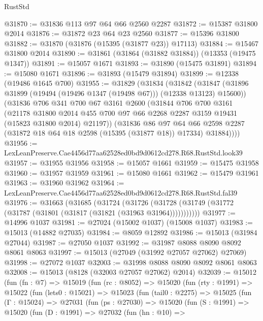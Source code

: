 \begin{lexlean}{RustStd}
\begin{coremodule}
@31870 := @31836 @113 @97 @64 @66 @2560 @2287
@31872 := @15387 @31800 @2014
@31876 := @31872 @23 @64 @23 @2560
@31877 := @15396 @31800
@31882 := @31870 (@31876 (@15395 (@31877 @23)) @17113)
@31884 := @15467 @31800 @2014
@31890 := @31861 (@31864 (@31882 @31884)) (@13353 (@19475 @1347))
@31891 := @15057 @1671
@31893 := @31890 (@15475 @31891)
@31894 := @15080 @1671
@31896 := @31893 (@15479 @31894)
@31899 := @12338 (@19486 @1645 @700)
@31955 := @31829
    (@31834
      (@31842
        (@31847 (@31896 @31899 (@19494 (@19496 @1347 (@19498 @67))) (@12338 @13123) @15600))
        (@31836
          @706
          @341
          @700
          @67
          @3161
          @2600
          (@31844
            @706
            @700
            @3161
            (@21178
              @31800
              @2014
              @455
              @700
              @97
              @66
              @2268
              @2287
              @3159
              @19431
              (@15823 @31800 @2014)
              @21197))
          (@31836
            @86
            @97
            @64
            @66
            @2598
            @2287
            (@31872 @18 @64 @18 @2598 (@15395 (@31877 @18)) @17334)
            @31884))))
@31956 := LexLeanPreserve.Cae4456d77aa62528ed0bd9d0612cd278.R68.RustStd.look39
@31957 := @31955 @31956
@31958 := @15057 @1661
@31959 := @15475 @31958
@31960 := @31957 @31959
@31961 := @15080 @1661
@31962 := @15479 @31961
@31963 := @31960 @31962
@31964 := LexLeanPreserve.Cae4456d77aa62528ed0bd9d0612cd278.R68.RustStd.fal39
@31976 := @31663
    (@31685
      (@31724
        (@31726 (@31728 (@31749 (@31772 (@31787 (@31801 (@31817 (@31821 (@31963 @31964)))))))))))
@31977 := @14996 @1037
@31981 := @27024 (@15002 @1037) (@15008 @1037)
@31983 := @15013 (@14882 @27035)
@31984 := @8059 @12892
@31986 := @15013 (@31984 @27044)
@31987 := @27050 @1037
@31992 := @31987 @8088 @8090 @8092 @8061 @8063
@31997 := @15013 (@27049 (@31992 @27057 @27062) @27069)
@31998 := @27072 @1037
@32003 := @31998 @8088 @8090 @8092 @8061 @8063
@32008 := @15013 (@8128 (@32003 @27057 @27062) @2014)
@32039 := @15012
    (fun (fn : @7) =>
    @15019
      (fun (rc : @8052) =>
      @15020
        (fun (rty : @1991) =>
        @15022
          (fun (lets0 : @15021) =>
          @15023
            (fun (tail0 : @2275) =>
            @15025
              (fun (Γ : @15024) =>
              @27031
                (fun (ps : @27030) =>
                @15020
                  (fun (S : @1991) =>
                  @15020
                    (fun (D : @1991) =>
                    @27032
                      (fun (hn : @10) =>

\end{coremodule}
\end{lexlean}
